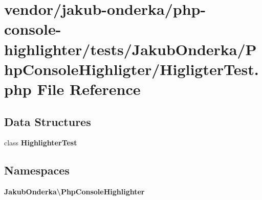 \section{vendor/jakub-\/onderka/php-\/console-\/highlighter/tests/\+Jakub\+Onderka/\+Php\+Console\+Highligter/\+Higligter\+Test.php File Reference}
\label{_higligter_test_8php}
\subsection*{Data Structures}
\begin{DoxyCompactItemize}
\item 
class {\bf Highlighter\+Test}
\end{DoxyCompactItemize}
\subsection*{Namespaces}
\begin{DoxyCompactItemize}
\item 
 {\bf Jakub\+Onderka\textbackslash{}\+Php\+Console\+Highlighter}
\end{DoxyCompactItemize}
